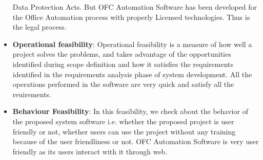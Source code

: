 \begin{itemize}
Data Protection Acts. But OFC Automation Software has been developed 
for the Office Automation process with properly Licensed technologies. 
Thus is the legal process.
\item {\bf{Operational feasibility}}: Operational feasibility is a measure 
of how well a project solves the problems, and takes advantage of the 
opportunities identified during scope definition and how it satisfies 
the requirements identified in the requirements analysis phase of system 
development. All the operations performed in the software are very quick 
and satisfy all the reuirements.
\item {\bf{Behaviour Feasibility}}: In this feasibility, we check about the 
behavior of the proposed system software i.e. whether the proposed 
project is user friendly or not, whether users can use the project 
without any training because of the user friendliness or not. OFC
Automation Software is very user friendly as its users interact with it 
through web.
\end{itemize}


